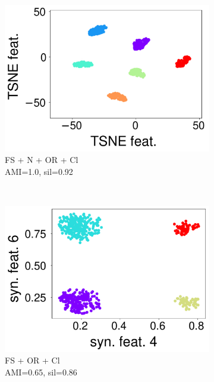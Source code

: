 \documentclass[runningheads]{llncs}
\begin{document}
\begin{figure}[t]  
    \begin{subfigure}[t]{0.31\columnwidth}
        \centering
        \includegraphics[scale=.15]{img/ft_sc_ou_cl.pdf}
        \caption{FS + N + OR + Cl\\ \scriptsize{AMI=1.0, sil=0.92}}
        \label{fig:d1}
    \end{subfigure}
    ~~
    \begin{subfigure}[t]{0.31\columnwidth}
        \centering
        \includegraphics[scale=.15]{img/dashboard_1_pred.pdf}      
        \caption{FS + OR + Cl\\ \scriptsize{AMI=0.65, sil=0.86}}
        \label{fig:d3}
    \end{subfigure}
    ~
    \begin{subfigure}[t]{0.31\columnwidth}

\end{subfigure}
\end{figure}
\end{document}
